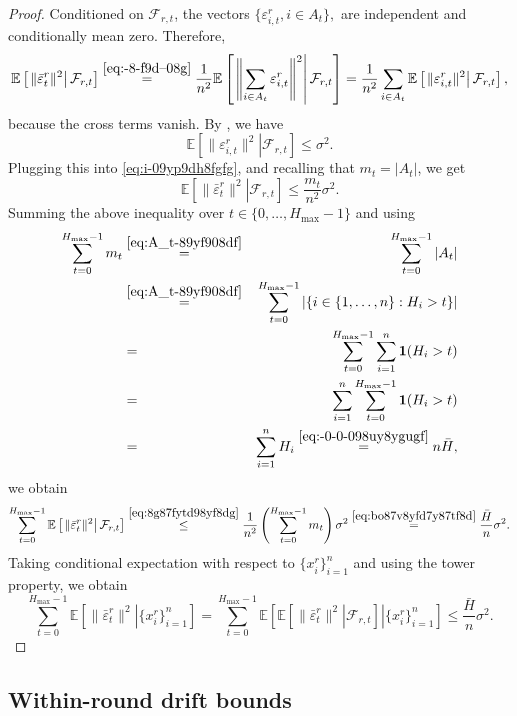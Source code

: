 \documentclass{article}
\newcommand{\cF}{\mathcal{F}}
\newcommand{\ExpCond}[2]{{\mathbb{E}}\left[\left.#1\right\vert#2\right]}
\theoremstyle{plain}
\theoremstyle{definition}
\begin{document}
\begin{proof}
Conditioned on \(\cF_{r,t}\), the vectors
\(
\{\varepsilon_{i,t}^r, i\in A_t\},
\)
are independent and conditionally mean zero.
Therefore,
\begin{equation}\label{eq:i-09yp9dh8fgfg}
\ExpCond{\|\bar\varepsilon_t^r\|^2 }{\cF_{r,t}}
\overset{\eqref{eq:-8-f9d--08g} }{=}
\frac1{n^2}
\ExpCond{\left\|\sum_{i\in A_t}\varepsilon_{i,t}^r\right\|^2 }{ \cF_{r,t} } =
\frac1{n^2}
\sum_{i\in A_t}
\ExpCond{\|\varepsilon_{i,t}^r\|^2 }{ \cF_{r,t}},
\end{equation}
because the cross terms vanish.
By , we have
\[
\ExpCond{\|\varepsilon_{i,t}^r\|^2}{ \cF_{r,t} }
\le
\sigma^2.
\]
Plugging this into \eqref{eq:i-09yp9dh8fgfg}, and recalling that  $m_t = |A_t|$, we get
\begin{equation}\label{eq:8g87fytd98yf8dg}
\ExpCond{\|\bar\varepsilon_t^r\|^2 }{ \cF_{r,t} }
\le
\frac{m_t}{n^2}\sigma^2.
\end{equation}
Summing the above inequality over \(t \in \{0,\dots, H_{\max}-1\}\) and using
\begin{eqnarray}
\sum_{t=0}^{H_{\max}-1} m_t & \overset{\eqref{eq:A_t-89yf908df}}{=} & \sum_{t=0}^{H_{\max}-1} |A_t|  \notag \\
& \overset{\eqref{eq:A_t-89yf908df}}{=} &\sum_{t=0}^{H_{\max}-1} \left| \{i\in\{1,\dots,n\}: H_i>t\} \right|  \notag \\
&=& \sum_{t=0}^{H_{\max}-1} \sum_{i=1}^{n} {\bf 1}(H_i > t)  \notag \\ 
&=& \sum_{i=1}^{n}  \sum_{t=0}^{H_{\max}-1} {\bf 1}(H_i > t) \notag \\ 
&=& \sum_{i=1}^n H_i \overset{\eqref{eq:-0-0-098uy8ygugf}}{=} n\bar H,\label{eq:bo87v8yfd7y87tf8d}
\end{eqnarray}
we obtain
\[
\sum_{t=0}^{H_{\max}-1}
\ExpCond{\|\bar\varepsilon_t^r\|^2}{ \cF_{r,t}  }
\overset{\eqref{eq:8g87fytd98yf8dg}}{\leq}
\frac{1}{n^2}\left(\sum_{t=0}^{H_{\max}-1} m_t\right)\sigma^2
\overset{\eqref{eq:bo87v8yfd7y87tf8d}}{=}
\frac{\bar H}{n}\sigma^2.
\]
Taking conditional expectation with respect to \(\{x_i^r\}_{i=1}^n\) and using the tower property, we obtain
\[
\sum_{t=0}^{H_{\max}-1}
\ExpCond{\|\bar\varepsilon_t^r\|^2}{\{x_i^r\}_{i=1}^n}
=
\sum_{t=0}^{H_{\max}-1}
\ExpCond{
\ExpCond{\|\bar\varepsilon_t^r\|^2}{\cF_{r,t}}
}{\{x_i^r\}_{i=1}^n}
\le
\frac{\bar H}{n}\sigma^2.
\]
\end{proof}


\subsection{Within-round drift bounds}
\end{document}
